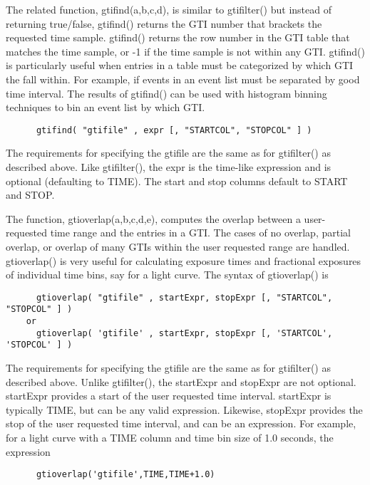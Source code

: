 \documentclass[11pt]{book}
\begin{document}
    The related function, gtifind(a,b,c,d), is similar to gtifilter()
    but instead of returning true/false, gtifind() returns the GTI
    number that brackets the requested time sample.  gtifind() returns
    the row number in the GTI table that matches the time sample, or
    -1 if the time sample is not within any GTI.  gtifind() is
    particularly useful when entries in a table must be categorized by
    which GTI the fall within.  For example, if events in an event
    list must be separated by good time interval.  The results of
    gtifind() can be used with histogram binning techniques to bin an
    event list by which GTI.
    
\begin{verbatim}
      gtifind( "gtifile" , expr [, "STARTCOL", "STOPCOL" ] )
\end{verbatim}

    The requirements for specifying the gtifile are the same as for
    gtifilter() as described above.  Like gtifilter(), the expr is
    the time-like expression and is optional (defaulting to TIME).
    The start and stop columns default to START and STOP.

    The function, gtioverlap(a,b,c,d,e), computes the overlap
    between a user-requested time range and the entries in a GTI.  The
    cases of no overlap, partial overlap, or overlap of many GTIs
    within the user requested range are handled.  gtioverlap() is very
    useful for calculating exposure times and fractional exposures of
    individual time bins, say for a light curve.  The syntax of
    gtioverlap() is

\begin{verbatim}
      gtioverlap( "gtifile" , startExpr, stopExpr [, "STARTCOL", "STOPCOL" ] )
    or
      gtioverlap( 'gtifile' , startExpr, stopExpr [, 'STARTCOL', 'STOPCOL' ] )
\end{verbatim}

    The requirements for specifying the gtifile are the same as for
    gtifilter() as described above.  Unlike gtifilter(), the startExpr
    and stopExpr are not optional.  startExpr provides a start of the
    user requested time interval.  startExpr is typically TIME, but
    can be any valid expression.  Likewise, stopExpr provides the stop
    of the user requested time interval, and can be an expression.
    For example, for a light curve with a TIME column and time bin
    size of 1.0 seconds, the expression

\begin{verbatim}
      gtioverlap('gtifile',TIME,TIME+1.0)
\end{verbatim}
\end{document}
